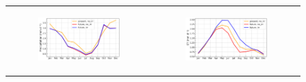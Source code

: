\begin{figure}[htbp]
    \centering
    \begin{tabular}{cc}
        \begin{subfigure}[b]{0.5\textwidth}
            \caption{}
            \includegraphics[width=\textwidth]{images/chap4/future/SC_precip_presfutirr.png}
        \end{subfigure} &
        \begin{subfigure}[b]{0.5\textwidth}
            \caption{}
            \includegraphics[width=\textwidth]{images/chap4/future/SC_evap_presfutirr.png}
        \end{subfigure} \\


\end{tabular}
\end{figure}
